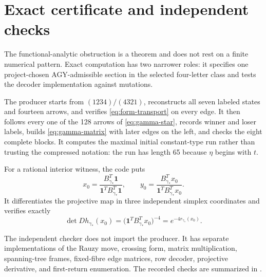 \section{Exact certificate and independent checks}
\label{sec:certificate}

The functional-analytic obstruction is a theorem and does not rest on a
finite numerical pattern.  Exact computation has two narrower roles: it
specifies one project-chosen AGY-admissible section in the selected
four-letter class and tests the decoder implementation against mutations.

The producer starts from \((1234)/(4321)\), reconstructs all seven labeled
states and fourteen arrows, and verifies
\eqref{eq:form-transport} on every edge.  It then follows every one of the
128 arrows of \eqref{eq:gamma-star}, records winner and loser labels, builds
\eqref{eq:gamma-matrix} with later edges on the left, and checks the eight
complete blocks.  It computes the maximal initial constant-type run rather
than trusting the compressed notation: the run has length 65 because
\(\eta\) begins with \(t\).

For a rational interior witness, the code puts
\begin{equation}
 x_0=\frac{B_{\gamma_*}^T\mathbf1}
          {\mathbf1^TB_{\gamma_*}^T\mathbf1},
 \qquad
 y_0=\frac{B_{\gamma_*}^Tx_0}
          {\mathbf1^TB_{\gamma_*}^Tx_0}.
 \label{eq:rational-points}
\end{equation}
It differentiates the projective map in three independent simplex
coordinates and verifies exactly
\begin{equation}
 \det Dh_{\gamma_*}(x_0)
 =\bigl(\mathbf1^TB_{\gamma_*}^Tx_0\bigr)^{-4}
 =e^{-4r_{\gamma_*}(x_0)}.
 \label{eq:jacobian-check}
\end{equation}

The independent checker does not import the producer.  It has separate
implementations of the Rauzy move, crossing form, matrix multiplication,
spanning-tree frames, fixed-fibre edge matrices, row decoder, projective
derivative, and first-return enumeration.  The
recorded checks are summarized in .

